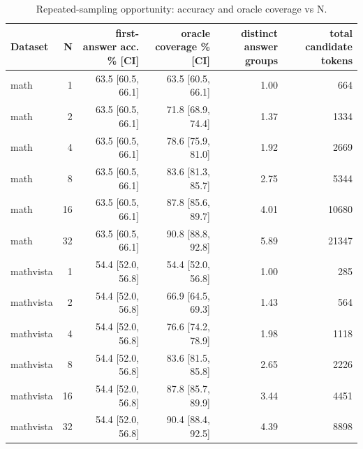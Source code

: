 \begin{table}[t]
\centering\small
\begin{tabular}{lrrrrr}
\toprule
Dataset & N & first-answer acc. \% [CI] & oracle coverage \% [CI] & distinct answer groups & total candidate tokens \\
\midrule
math & 1 & 63.5 [60.5, 66.1] & 63.5 [60.5, 66.1] & 1.00 & 664 \\
math & 2 & 63.5 [60.5, 66.1] & 71.8 [68.9, 74.4] & 1.37 & 1334 \\
math & 4 & 63.5 [60.5, 66.1] & 78.6 [75.9, 81.0] & 1.92 & 2669 \\
math & 8 & 63.5 [60.5, 66.1] & 83.6 [81.3, 85.7] & 2.75 & 5344 \\
math & 16 & 63.5 [60.5, 66.1] & 87.8 [85.6, 89.7] & 4.01 & 10680 \\
math & 32 & 63.5 [60.5, 66.1] & 90.8 [88.8, 92.8] & 5.89 & 21347 \\
mathvista & 1 & 54.4 [52.0, 56.8] & 54.4 [52.0, 56.8] & 1.00 & 285 \\
mathvista & 2 & 54.4 [52.0, 56.8] & 66.9 [64.5, 69.3] & 1.43 & 564 \\
mathvista & 4 & 54.4 [52.0, 56.8] & 76.6 [74.2, 78.9] & 1.98 & 1118 \\
mathvista & 8 & 54.4 [52.0, 56.8] & 83.6 [81.5, 85.8] & 2.65 & 2226 \\
mathvista & 16 & 54.4 [52.0, 56.8] & 87.8 [85.7, 89.9] & 3.44 & 4451 \\
mathvista & 32 & 54.4 [52.0, 56.8] & 90.4 [88.4, 92.5] & 4.39 & 8898 \\
\bottomrule
\end{tabular}
\caption{Repeated-sampling opportunity: accuracy and oracle coverage vs N.}
\label{tab:task3_opportunity}
\end{table}
